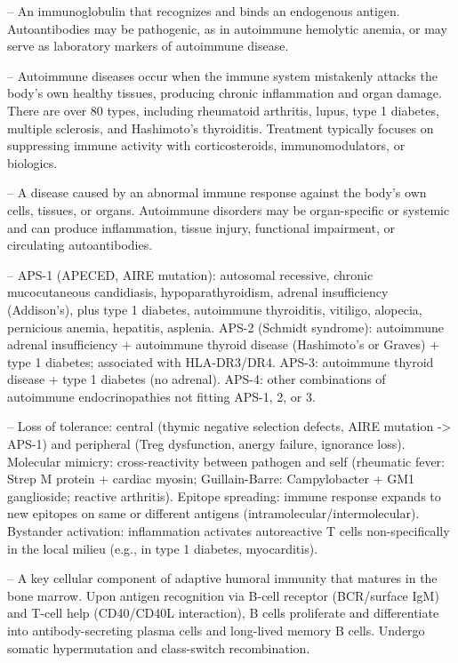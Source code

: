 -- An immunoglobulin that recognizes and binds an endogenous antigen. Autoantibodies may be pathogenic, as in autoimmune hemolytic anemia, or may serve as laboratory markers of autoimmune disease.

-- Autoimmune diseases occur when the immune system mistakenly attacks the body's own healthy tissues, producing chronic inflammation and organ damage. There are over 80 types, including rheumatoid arthritis, lupus, type 1 diabetes, multiple sclerosis, and Hashimoto's thyroiditis. Treatment typically focuses on suppressing immune activity with corticosteroids, immunomodulators, or biologics.

-- A disease caused by an abnormal immune response against the body's own cells, tissues, or organs. Autoimmune disorders may be organ-specific or systemic and can produce inflammation, tissue injury, functional impairment, or circulating autoantibodies.

-- APS-1 (APECED, AIRE mutation): autosomal recessive, chronic mucocutaneous candidiasis, hypoparathyroidism, adrenal insufficiency (Addison's), plus type 1 diabetes, autoimmune thyroiditis, vitiligo, alopecia, pernicious anemia, hepatitis, asplenia. APS-2 (Schmidt syndrome): autoimmune adrenal insufficiency + autoimmune thyroid disease (Hashimoto's or Graves) + type 1 diabetes; associated with HLA-DR3/DR4. APS-3: autoimmune thyroid disease + type 1 diabetes (no adrenal). APS-4: other combinations of autoimmune endocrinopathies not fitting APS-1, 2, or 3.

-- Loss of tolerance: central (thymic negative selection defects, AIRE mutation -> APS-1) and peripheral (Treg dysfunction, anergy failure, ignorance loss). Molecular mimicry: cross-reactivity between pathogen and self (rheumatic fever: Strep M protein + cardiac myosin; Guillain-Barre: Campylobacter + GM1 ganglioside; reactive arthritis). Epitope spreading: immune response expands to new epitopes on same or different antigens (intramolecular/intermolecular). Bystander activation: inflammation activates autoreactive T cells non-specifically in the local milieu (e.g., in type 1 diabetes, myocarditis).

-- A key cellular component of adaptive humoral immunity that matures in the bone marrow. Upon antigen recognition via B-cell receptor (BCR/surface IgM) and T-cell help (CD40/CD40L interaction), B cells proliferate and differentiate into antibody-secreting plasma cells and long-lived memory B cells. Undergo somatic hypermutation and class-switch recombination.

